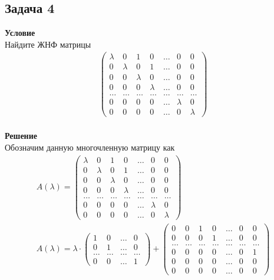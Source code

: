 		\subsection*{\textbf{Задача 4}}
		\textbf{Условие}\\
		Найдите ЖНФ матрицы
		\begin{gather*}
			\begin{pmatrix}
				\lambda & 0 & 1 & 0 & \ldots & 0 & 0 \\
				0 & \lambda & 0 & 1 & \ldots & 0 & 0 \\
				0 & 0 & \lambda & 0 & \ldots & 0 & 0 \\
				0 & 0 & 0 & \lambda & \ldots & 0 & 0 \\
				\ldots & \ldots & \ldots & \ldots & \ldots & \ldots & \ldots\\
				0 & 0 & 0 & 0 & \ldots & \lambda & 0 \\
				0 & 0 & 0 & 0 & \ldots & 0 & \lambda
			\end{pmatrix}
		\end{gather*}
		\\
		\textbf{Решение}\\
		Обозначим данную многочленную матрицу как 
		\begin{gather*}
			A(\lambda) = 
			\begin{pmatrix}
				\lambda & 0 & 1 & 0 & \ldots & 0 & 0 \\
				0 & \lambda & 0 & 1 & \ldots & 0 & 0 \\
				0 & 0 & \lambda & 0 & \ldots & 0 & 0 \\
				0 & 0 & 0 & \lambda & \ldots & 0 & 0 \\
				\ldots & \ldots & \ldots & \ldots & \ldots & \ldots & \ldots\\
				0 & 0 & 0 & 0 & \ldots & \lambda & 0 \\
				0 & 0 & 0 & 0 & \ldots & 0 & \lambda
			\end{pmatrix}\\
			A(\lambda) = \lambda \cdot 
			\begin{pmatrix}
				1 & 0 & \ldots & 0 \\
				0 & 1 & \ldots & 0 \\
				\ldots & \ldots & \ldots & \ldots\\
				0 & 0 & \ldots & 1
			\end{pmatrix}
			+
			\begin{pmatrix}
				0 & 0 & 1 & 0 & \ldots & 0 & 0 \\
				0 & 0 & 0 & 1 & \ldots & 0 & 0 \\
				\ldots & \ldots & \ldots & \ldots & \ldots & \ldots & \ldots\\
				0 & 0 & 0 & 0 & \ldots & 0 & 1\\
				0 & 0 & 0 & 0 & \ldots & 0 & 0\\
				0 & 0 & 0 & 0 & \ldots & 0 & 0
			\end{pmatrix}\\
		\end{gather*}
